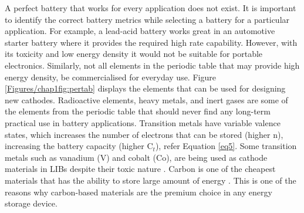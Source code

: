 A perfect battery that works for every application does not exist. It is important to identify the correct battery metrics while selecting a battery for a particular application. For example, a lead-acid battery works great in an automotive starter battery where it provides the required high rate capability. However, with its toxicity and low energy density it would not be suitable for portable electronics. Similarly, not all elements in the periodic table that may provide high energy density, be commercialised for everyday use. Figure \ref{Figures/chap1fig:pertab} displays the elements that can be used for designing new cathodes. Radioactive elements, heavy metals, and inert gases are some of the elements from the periodic table that should never find any long-term practical use in battery applications. Transition metals have variable valence states, which increases the number of electrons that can be stored (higher n), increasing the battery capacity (higher C$_t$), refer Equation \ref{eq5}. Some transition metals such as vanadium (V) and cobalt (Co), are being used as cathode materials in LIBs despite their toxic nature \cite{cui_carbon/titanium_2010,qu_vanadium_2019,salunkhe_direct_2014,spreafico_pvdf_2014}. Carbon is one of the cheapest materials that has the ability to store large amount of energy \cite{candelaria_nanostructured_2012}. This is one of the reasons why carbon-based materials are the premium choice in any energy storage device.
